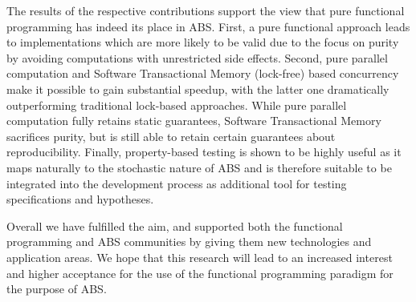The results of the respective contributions support the view that pure functional programming has indeed its place in ABS. First, a pure functional approach leads to implementations which are more likely to be valid due to the focus on purity by avoiding computations with unrestricted side effects. Second, pure parallel computation and Software Transactional Memory (lock-free) based concurrency make it possible to gain substantial speedup, with the latter one dramatically outperforming traditional lock-based approaches. While pure parallel computation fully retains static guarantees, Software Transactional Memory sacrifices purity, but is still able to retain certain guarantees about reproducibility. Finally, property-based testing is shown to be highly useful as it maps naturally to the stochastic nature of ABS and is therefore suitable to be integrated into the development process as additional tool for testing specifications and hypotheses.

Overall we have fulfilled the aim, and supported both the functional programming and ABS communities by giving them new technologies and application areas. We hope that this research will lead to an increased interest and higher acceptance for the use of the functional programming paradigm for the purpose of ABS.
